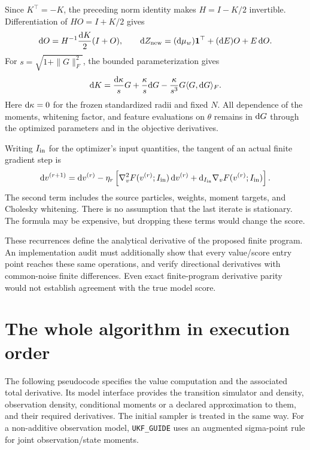 Since \(K^\top=-K\), the preceding norm identity makes
\(H=I-K/2\) invertible. Differentiation of \(HO=I+K/2\) gives
\begin{equation}
\label{eq:bf-covariance-proposal-cayley-tangent}
 \mathrm d O=H^{-1}\frac{\mathrm d K}{2}(I+O),\qquad
 \mathrm d Z_{\rm new}=(\mathrm d\mu_w)\mathbf 1^\top+(\mathrm d E)O+E\,\mathrm d O .
\end{equation}
For \(s=\sqrt{1+\|G\|_F^2}\), the bounded parameterization gives
\[
 \mathrm d K=\frac{\mathrm d\kappa}{s}G+\frac{\kappa}{s}\mathrm d G
       -\frac{\kappa}{s^3}G\langle G,\mathrm d G\rangle_F.
\]
Here \(\mathrm d\kappa=0\) for the frozen standardized radii and fixed \(N\).
All dependence of the moments, whitening factor, and feature evaluations
on \(\theta\) remains in \(\mathrm d G\) through the optimized parameters
and in the objective derivatives.

Writing \(I_{\rm in}\) for the optimizer's input quantities, the tangent
of an actual finite gradient step is
\begin{equation}
\label{eq:bf-covariance-proposal-optimizer-tangent}
 \mathrm d v^{(r+1)}
 =\mathrm d v^{(r)}
 -\eta_r\left[
   \nabla_v^2F(v^{(r)};I_{\rm in})\,\mathrm d v^{(r)}
   +\mathrm d_{I_{\rm in}}\nabla_vF(v^{(r)};I_{\rm in})\right].
\end{equation}
The second term includes the source particles, weights, moment targets,
and Cholesky whitening. There is no assumption that the last iterate is
stationary. The formula may be expensive, but dropping these terms would
change the score.

These recurrences define the analytical derivative of the proposed
finite program. An implementation audit must additionally show that every value/score entry point reaches these same operations,
and verify directional derivatives with common-noise finite differences.
Even exact finite-program derivative parity would not establish agreement
with the true model score.


\section{The whole algorithm in execution order}

The following pseudocode specifies the value computation and the associated
total derivative. Its model interface provides the transition simulator and
density, observation density, conditional moments or a declared approximation
to them, and their required derivatives. The initial sampler is treated in
the same way. For a non-additive observation model, \texttt{UKF\_GUIDE}
uses an augmented sigma-point rule for joint observation/state moments.

